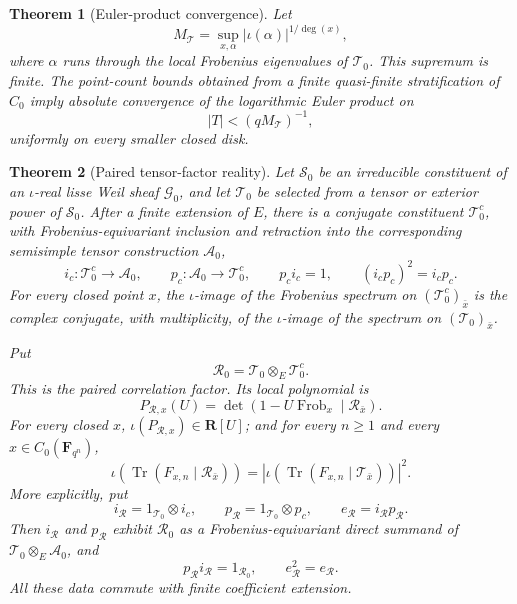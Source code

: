 \documentclass[10pt]{article}
\newtheorem{theorem}{Theorem}[section]
\theoremstyle{definition}
\newcommand{\Frob}{\operatorname{Frob}}
\begin{document}
\begin{theorem}[Euler-product convergence]
Let
\[
 M_{\mathcal T}=\sup_{x,\alpha}
       |\iota(\alpha)|^{1/\deg(x)},
\]
where \(\alpha\) runs through the local Frobenius eigenvalues of
\(\mathcal T_0\).  This supremum is finite.  The point-count bounds obtained from a finite
quasi-finite stratification of \(C_0\) imply absolute convergence of the
logarithmic Euler product on
\[
                         |T|<(qM_{\mathcal T})^{-1},
\]
uniformly on every smaller closed disk.
\end{theorem}

\begin{theorem}[Paired tensor-factor reality]
Let \(\mathcal S_0\) be an irreducible constituent of an \(\iota\)-real
lisse Weil sheaf \(\mathcal G_0\), and let \(\mathcal T_0\) be selected
from a tensor or exterior power of \(\mathcal S_0\).  After a finite
extension of \(E\), there is a conjugate constituent
\(\mathcal T_0^c\), with Frobenius-equivariant inclusion and retraction
into the corresponding semisimple tensor construction \(\mathcal A_0\),
\[
 i_c:\mathcal T_0^c\longrightarrow\mathcal A_0,
 \qquad p_c:\mathcal A_0\longrightarrow\mathcal T_0^c,
 \qquad p_ci_c=1,\qquad(i_cp_c)^2=i_cp_c.
\]
For every closed point \(x\), the \(\iota\)-image of the Frobenius
spectrum on \((\mathcal T_0^c)_{\bar x}\) is the complex conjugate, with
multiplicity, of the \(\iota\)-image of the spectrum on
\((\mathcal T_0)_{\bar x}\).

Put
\[
             \mathcal R_0=\mathcal T_0\otimes_E\mathcal T_0^c .
\]
This is the \emph{paired correlation factor}.  Its local polynomial is
\[
 P_{\mathcal R,x}(U)=
 \det(1-U\Frob_x\mid\mathcal R_{\bar x}).
\]
For every closed \(x\),
\(\iota(P_{\mathcal R,x})\in\mathbf R[U]\); and for every \(n\ge1\) and
every \(x\in C_0(\mathbf F_{q^n})\),
\[
 \iota\!\left(\operatorname{Tr}
       (F_{x,n}\mid\mathcal R_{\bar x})\right)
 =\left|\iota\!\left(\operatorname{Tr}
       (F_{x,n}\mid\mathcal T_{\bar x})\right)\right|^2.
\]
More explicitly, put
\[
 i_{\mathcal R}=1_{\mathcal T_0}\otimes i_c,\qquad
 p_{\mathcal R}=1_{\mathcal T_0}\otimes p_c,\qquad
 e_{\mathcal R}=i_{\mathcal R}p_{\mathcal R}.
\]
Then \(i_{\mathcal R}\) and \(p_{\mathcal R}\) exhibit
\(\mathcal R_0\) as a Frobenius-equivariant direct summand of
\(\mathcal T_0\otimes_E\mathcal A_0\), and
\[
 p_{\mathcal R}i_{\mathcal R}=1_{\mathcal R_0},\qquad
 e_{\mathcal R}^2=e_{\mathcal R}.
\]
All these data commute with finite coefficient extension.
\end{theorem}
\end{document}

